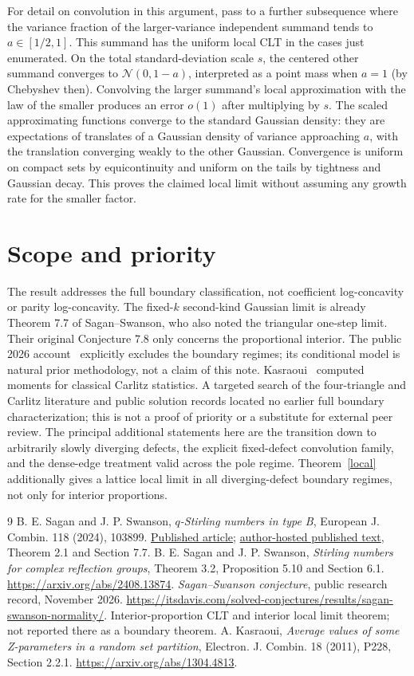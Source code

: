 \documentclass[11pt]{article}
\begin{document}
For detail on convolution in this argument, pass to a further subsequence where the variance fraction of the larger-variance independent summand tends to $a\in[1/2,1]$. This summand has the uniform local CLT in the cases just enumerated. On the total standard-deviation scale $s$, the centered other summand converges to $\mathcal N(0,1-a)$, interpreted as a point mass when $a=1$ (by Chebyshev then). Convolving the larger summand's local approximation with the law of the smaller produces an error $o(1)$ after multiplying by $s$. The scaled approximating functions converge to the standard Gaussian density: they are expectations of translates of a Gaussian density of variance approaching $a$, with the translation converging weakly to the other Gaussian. Convergence is uniform on compact sets by equicontinuity and uniform on the tails by tightness and Gaussian decay. This proves the claimed local limit without assuming any growth rate for the smaller factor.

\section*{Scope and priority}
The result addresses the full boundary classification, not coefficient log-concavity or parity log-concavity. The fixed-$k$ second-kind Gaussian limit is already Theorem 7.7 of Sagan--Swanson, who also noted the triangular one-step limit. Their original Conjecture 7.8 only concerns the proportional interior. The public 2026 account~\cite{prior} explicitly excludes the boundary regimes; its conditional model is natural prior methodology, not a claim of this note. Kasraoui~\cite{kas} computed moments for classical Carlitz statistics. A targeted search of the four-triangle and Carlitz literature and public solution records located no earlier full boundary characterization; this is not a proof of priority or a substitute for external peer review. The principal additional statements here are the transition down to arbitrarily slowly diverging defects, the explicit fixed-defect convolution family, and the dense-edge treatment valid across the pole regime. Theorem~\ref{local} additionally gives a lattice local limit in all diverging-defect boundary regimes, not only for interior proportions.
\begin{thebibliography}{9}
 B. E. Sagan and J. P. Swanson, \emph{$q$-Stirling numbers in type B}, European J. Combin. 118 (2024), 103899. \href{https://doi.org/10.1016/j.ejc.2023.103899}{Published article}; \href{https://users.math.msu.edu/users/bsagan/Papers/Old/qStB-pub.pdf}{author-hosted published text}, Theorem 2.1 and Section 7.7.
 B. E. Sagan and J. P. Swanson, \emph{Stirling numbers for complex reflection groups}, Theorem 3.2, Proposition 5.10 and Section 6.1. \url{https://arxiv.org/abs/2408.13874}.
 \emph{Sagan--Swanson conjecture}, public research record, November 2026. \url{https://itsdavis.com/solved-conjectures/results/sagan-swanson-normality/}. Interior-proportion CLT and interior local limit theorem; not reported there as a boundary theorem.
 A. Kasraoui, \emph{Average values of some Z-parameters in a random set partition}, Electron. J. Combin. 18 (2011), P228, Section 2.2.1. \url{https://arxiv.org/abs/1304.4813}.
\end{thebibliography}
\end{document}
